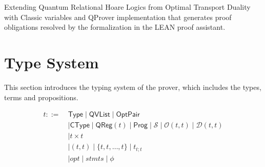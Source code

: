 
Extending Quantum Relational Hoare Logics from Optimal Transport Duality with Classic variables and QProver implementation that generates proof obligations resolved by the formalization in the LEAN proof assistant.



\section{Type System}
This section introduces the typing system of the prover, which includes the types, terms and propositions.

\newcommand{\Type}{\textsf{Type}}
\newcommand{\CType}{\textsf{CType}}
\newcommand{\SType}{\ensuremath{\mathcal{S}}}

\newcommand{\qreg}[1]{\ensuremath{\textsf{QReg}(#1)}}
\newcommand{\qvlist}{\textsf{QVList}}
\newcommand{\opt}[2]{\ensuremath{\mathcal{O}(#1, #2)}}
\newcommand{\ldirac}[2]{\ensuremath{\mathcal{D}(#1, #2)}}

\newcommand{\lopt}{\ensuremath{\textsf{LOpt}}}
\newcommand{\optpair}{\ensuremath{\textsf{OptPair}}}
\newcommand{\unitary}[1]{\ensuremath{\textsf{Unitary}({#1})}}
\newcommand{\assn}[1]{\ensuremath{\textsf{Assn}(#1)}}
\newcommand{\meas}[1]{\ensuremath{\textsf{Meas}(#1)}}
\newcommand{\prog}{\ensuremath{\textsf{Prog}}}
\newcommand{\prop}{\ensuremath{\textsf{Prop}}}
\newcommand{\judge}[4]{\ensuremath{\{#1\}~#2 \sim #3~\{#4\}}}

\begin{definition}
    \begin{align*}
        t ::=\ & \Type \mid \qvlist \mid \optpair \\
        & \mid \CType \mid \qreg{t} \mid \prog \mid \SType \mid \opt{t}{t} \mid \ldirac{t}{t} \\
        & \mid t \times t  \\ 
        & \mid (t, t) \mid \{t, t, \dots, t\} \mid t_{t;t} \\
        & \mid opt \mid stmts \mid \phi
    \end{align*}
\end{definition}

